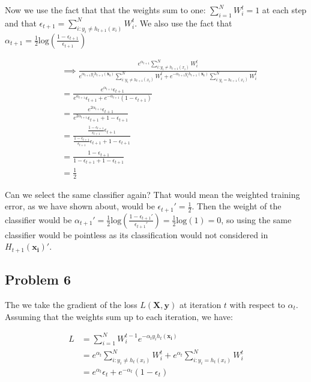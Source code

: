 \documentclass[a4paper,12pt]{article}
\begin{document}
Now we use the fact that that the weights sum to one: $\sum_{i=1}^N W_i^{t} = 1$ at each step and that $\epsilon_{t+1} = \sum_{i: y_i \neq h_{t+1}(x_i)}^N W_i^t$. We also use the fact that $\alpha_{t+1} = \frac{1}{2} \textrm{log}( \frac{1 - \epsilon_{t+1}}{\epsilon_{t+1}} ) $ 

$$
\begin{aligned}
    &\implies \frac{e^{\alpha_{t+1}} \sum_{i: y_i \neq h_{t+1}(x_i) }^N W_i^t}
	{e^{\alpha_{t+1}y_ih_{t+1}(\mathbf{x_i}) } \sum_{i: y_i \neq h_{t+1}(x_i)}^N W_i^t + e^{-\alpha_{t+1}y_ih_{t+1}(\mathbf{x_i}) } \sum_{i: y_i = h_{t+1}(x_i)}^N W_i^t } \\
    &= \frac{e^{\alpha_{t+1}} \epsilon_{t+1} }{ e^{\alpha_{t+1}} \epsilon_{t+1} + e^{-\alpha_{t+1}} (1 - \epsilon_{t+1} ) } \\
    &= \frac{e^{2\alpha_{t+1}} \epsilon_{t+1} }{ e^{2\alpha_{t+1}} \epsilon_{t+1} + 1 - \epsilon_{t+1}} \\
    &= \frac{ \frac{1 - \epsilon_{t+1}}{\epsilon_{t+1}} \epsilon_{t+1}}{\frac{1 - \epsilon_{t+1}}{\epsilon_{t+1}} \epsilon_{t+1} + 1 - \epsilon_{t+1}} \\ 
    &= \frac{1 - \epsilon_{t+1}}{1 - \epsilon_{t+1} + 1 - \epsilon_{t+1}} \\ 
    &= \frac{1}{2} 
\end{aligned} 
$$

Can we select the same classifier again? That would mean the weighted training error, as we have shown about, would be 
$\epsilon_{t+1}' = \frac{1}{2}$. Then the weight of the classifier would be 
$\alpha_{t+1}' = \frac{1}{2} \textrm{log}(\frac{1 - \epsilon_{t+1}'}{\epsilon_{t+1}'}) = \frac{1}{2}\textrm{log}(1) = 0$, so using the same classifier would be pointless as its classification would not considered in $H_{t+1}(\mathbf{x_i})'$. 

\subsection{Problem 6}

The we take the gradient of the loss $L(\mathbf{X, y})$ at iteration $t$ with respect to $\alpha_t$. Assuming that the weights sum up to each iteration, we have: 

$$
\begin{aligned} 
	L &= \sum_{i=1}^N W_i^{t-1}e^{-\alpha_t y_i h_{t}(\mathbf{x_i})} \\
	&= e^{\alpha_{t}}\sum_{i: y_i \neq h_{t}(x_i)}^N W_i^t + e^{\alpha_{t}}\sum_{i: y_i = h_{t}(x_i)}^N W_i^t \\ 
	&= e^{\alpha_{t}}\epsilon_{t} + e^{-\alpha_{t}}(1 - \epsilon_{t})  
\end{aligned} 
$$
\end{document}
